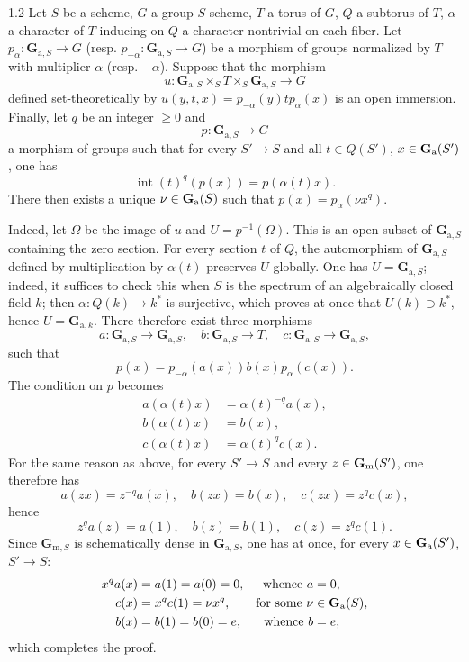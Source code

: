 \begin{lemma}{1.2}\label{XX.1.2}
Let $S$ be a scheme, $G$ a group $S$-scheme, $T$ a torus of $G$, $Q$ a subtorus of $T$, $\alpha$ a character of $T$ inducing on $Q$ a character nontrivial on each fiber. Let $p_\alpha:\mathbf G_{\mathrm a,S}\to G$ (resp. $p_{-\alpha}:\mathbf G_{\mathrm a,S}\to G$) be a morphism of groups normalized by $T$ with multiplier $\alpha$ (resp. $-\alpha$). Suppose that the morphism
\[
u:\mathbf G_{\mathrm a,S}\mathbin{\times_S}T\mathbin{\times_S}\mathbf G_{\mathrm a,S}\to G
\]
defined set-theoretically by $u(y,t,x)=p_{-\alpha}(y)tp_\alpha(x)$ is an open immersion. Finally, let $q$ be an integer $\geq0$ and
\[
p:\mathbf G_{\mathrm a,S}\to G
\]
a morphism of groups such that for every $S'\to S$ and all $t\in Q(S')$, $x\in\mathbf{G}_{\mathrm{a}}(S')$, one has
\[
\operatorname{int}(t)^q(p(x))=p(\alpha(t)x).
\]
There then exists a unique $\nu\in\mathbf{G}_{\mathrm{a}}(S)$ such that $p(x)=p_\alpha(\nu x^q)$.
\end{lemma}
Indeed, let $\Omega$ be the image of $u$ and $U=p^{-1}(\Omega)$. This is an open subset of $\mathbf G_{\mathrm a,S}$ containing the zero section. For every section $t$ of $Q$, the automorphism of $\mathbf G_{\mathrm a,S}$ defined by multiplication by $\alpha(t)$ preserves $U$ globally. One has $U=\mathbf G_{\mathrm a,S}$; indeed, it suffices to check this when $S$ is the spectrum of an algebraically closed field $k$; then $\alpha:Q(k)\to k^*$ is surjective, which proves at once that $U(k)\supset k^*$, hence $U=\mathbf G_{\mathrm a,k}$. There therefore exist three morphisms
\[
a:\mathbf G_{\mathrm a,S}\to\mathbf G_{\mathrm a,S},\quad
b:\mathbf G_{\mathrm a,S}\to T,\quad
c:\mathbf G_{\mathrm a,S}\to\mathbf G_{\mathrm a,S},
\]
such that
\[
p(x)=p_{-\alpha}(a(x))b(x)p_\alpha(c(x)).
\]
The condition on $p$ becomes
\[
\begin{aligned}
a(\alpha(t)x)&=\alpha(t)^{-q}a(x),\\
b(\alpha(t)x)&=b(x),\\
c(\alpha(t)x)&=\alpha(t)^qc(x).
\end{aligned}
\]
For the same reason as above, for every $S'\to S$ and every $z\in\mathbf{G}_{\mathrm{m}}(S')$, one therefore has
\[
a(zx)=z^{-q}a(x),\quad b(zx)=b(x),\quad c(zx)=z^qc(x),
\]
hence
\[
z^qa(z)=a(1),\quad b(z)=b(1),\quad c(z)=z^qc(1).
\]
Since $\mathbf G_{\mathrm m,S}$ is schematically dense in $\mathbf G_{\mathrm a,S}$, one has at once, for every $x\in\mathbf{G}_{\mathrm{a}}(S')$, $S'\to S$:
\[
\begin{aligned}
x^qa(x)&=a(1)=a(0)=0,&\text{whence }a&=0,\\
c(x)&=x^qc(1)=\nu x^q,&\text{for some }\nu&\in\mathbf{G}_{\mathrm{a}}(S),\\
b(x)&=b(1)=b(0)=e,&\text{whence }b&=e,
\end{aligned}
\]
which completes the proof.


